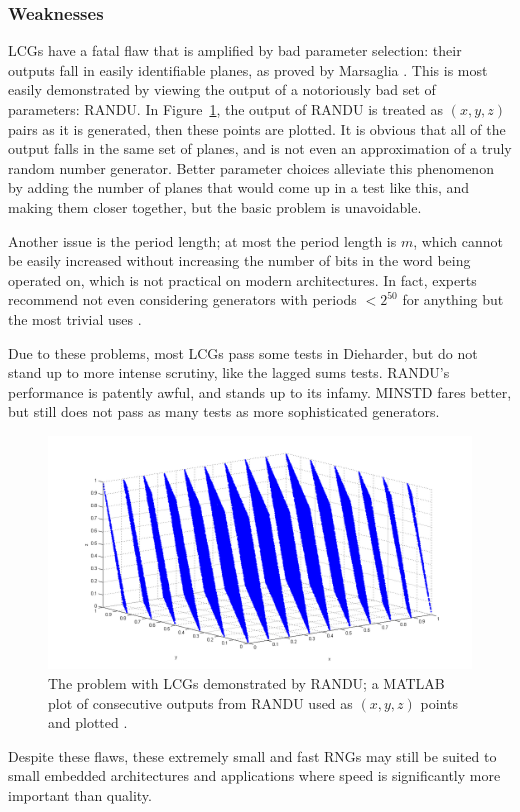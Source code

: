 \subsubsection{Weaknesses}

LCGs have a fatal flaw that is amplified by bad parameter selection: their outputs fall in easily identifiable planes, as proved by Marsaglia \cite{randomnumbersinplanes}. This is most easily demonstrated by viewing the output of a notoriously bad set of parameters: RANDU. In Figure~\ref{fig:randu_fig}, the output of RANDU is treated as $(x,y,z)$ pairs as it is generated, then these points are plotted. It is obvious that all of the output falls in the same set of planes, and is not even an approximation of a truly random number generator. Better parameter choices alleviate this phenomenon by adding the number of planes that would come up in a test like this, and making them closer together, but the basic problem is unavoidable.

Another issue is the period length; at most the period length is $m$, which cannot be easily increased without increasing the number of bits in the word being operated on, which is not practical on modern architectures. In fact, experts recommend not even considering generators with periods $<2^{50}$ for anything but the most trivial uses \cite{L'Ecuyer:1992:TRN:167293.167354}.

Due to these problems, most LCGs pass some tests in Dieharder, but do not stand up to more intense scrutiny, like the lagged sums tests. RANDU's performance is patently awful, and stands up to its infamy. MINSTD fares better, but still does not pass as many tests as more sophisticated generators.

\begin{figure}[tb]
    \begin{center}
        \includegraphics[width=\linewidth]{figures/randu.png}
    \end{center}
    \caption{The problem with LCGs demonstrated by RANDU; a MATLAB plot of consecutive outputs from RANDU used as $(x,y,z)$ points and plotted \cite{randu_fig}.}
    \label{fig:randu_fig}
\end{figure}

Despite these flaws, these extremely small and fast RNGs may still be suited to small embedded architectures and applications where speed is significantly more important than quality.
